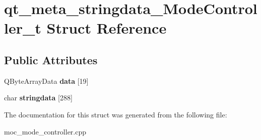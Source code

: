 \hypertarget{structqt__meta__stringdata__ModeController__t}{\section{qt\-\_\-meta\-\_\-stringdata\-\_\-\-Mode\-Controller\-\_\-t Struct Reference}
\label{structqt__meta__stringdata__ModeController__t}
}
\subsection*{Public Attributes}
\begin{DoxyCompactItemize}
\item 
\hypertarget{structqt__meta__stringdata__ModeController__t_ad7d6a10ece3f4b2705c8aa3a6f44db16}{Q\-Byte\-Array\-Data {\bfseries data} \mbox{[}19\mbox{]}}\label{structqt__meta__stringdata__ModeController__t_ad7d6a10ece3f4b2705c8aa3a6f44db16}

\item 
\hypertarget{structqt__meta__stringdata__ModeController__t_abc35ef4e86b87a4fb8a1862169297a5d}{char {\bfseries stringdata} \mbox{[}288\mbox{]}}\label{structqt__meta__stringdata__ModeController__t_abc35ef4e86b87a4fb8a1862169297a5d}

\end{DoxyCompactItemize}


The documentation for this struct was generated from the following file\-:\begin{DoxyCompactItemize}
\item 
moc\-\_\-mode\-\_\-controller.\-cpp\end{DoxyCompactItemize}
